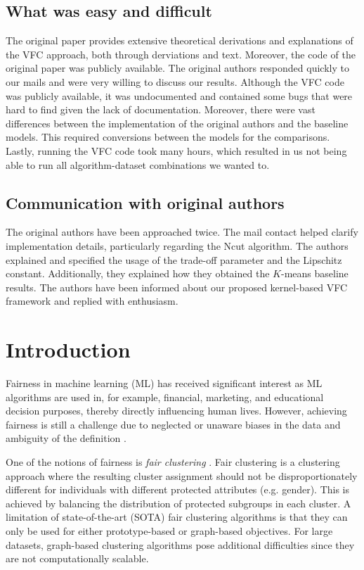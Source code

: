 \subsection*{What was easy and difficult}

The original paper provides extensive theoretical derivations and explanations of the VFC approach, both through derviations and text. Moreover, the code of the original paper was publicly available. The original authors responded quickly to our mails and were very willing to discuss our results.
Although the VFC code was publicly available, it was undocumented and contained some bugs that were hard to find given the lack of documentation. Moreover, there were vast differences between the implementation of the original authors and the baseline models. This required conversions between the models for the comparisons. Lastly, running the VFC code took many hours, which resulted in us not being able to run all algorithm-dataset combinations we wanted to.

\subsection*{Communication with original authors}
The original authors have been approached twice. The mail contact helped clarify implementation details, particularly regarding the Ncut algorithm. The authors explained and specified the usage of the trade-off parameter and the Lipschitz constant. Additionally, they explained how they obtained the $K$-means baseline results. The authors have been informed about our proposed kernel-based VFC framework and replied with enthusiasm.

\newpage

\section{Introduction}
Fairness in machine learning (ML) has received significant interest as ML algorithms are used in, for example, financial, marketing, and educational decision purposes, thereby directly influencing human lives. However, achieving fairness is still a challenge due to neglected or unaware biases in the data and ambiguity of the definition \cite{mehrabi2021survey}.

One of the notions of fairness is \textit{fair clustering} \cite{chierichetti2018fair, bera2019fair,backurs2019scalable, huang2019coresets, rosner2018privacy, schmidt2018fair, kleindessner2019guarantees}. Fair clustering is a clustering approach where the resulting cluster assignment should not be disproportionately different for individuals with different protected attributes (e.g. gender). This is achieved by balancing the distribution of protected subgroups in each cluster. A limitation of state-of-the-art (SOTA) fair clustering algorithms is that they can only be used for either prototype-based or graph-based objectives. For large datasets, graph-based clustering algorithms pose additional difficulties since they are not computationally scalable.

